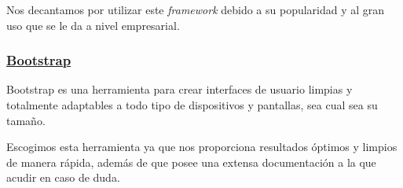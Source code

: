        Nos decantamos por utilizar este \textit{framework} debido a su popularidad y al gran uso que se le da a nivel empresarial.

        \subsubsection{\underline{Bootstrap}}
         Bootstrap\cite{bootstrap} es una herramienta para crear interfaces de usuario limpias y totalmente adaptables a todo tipo de dispositivos y pantallas, sea cual sea su tamaño.
         \newline
         
         Escogimos esta herramienta ya que nos proporciona resultados óptimos y limpios de manera rápida, además de que posee una extensa documentación\cite{documentationboostrap} a la que acudir en caso de duda.

   
     